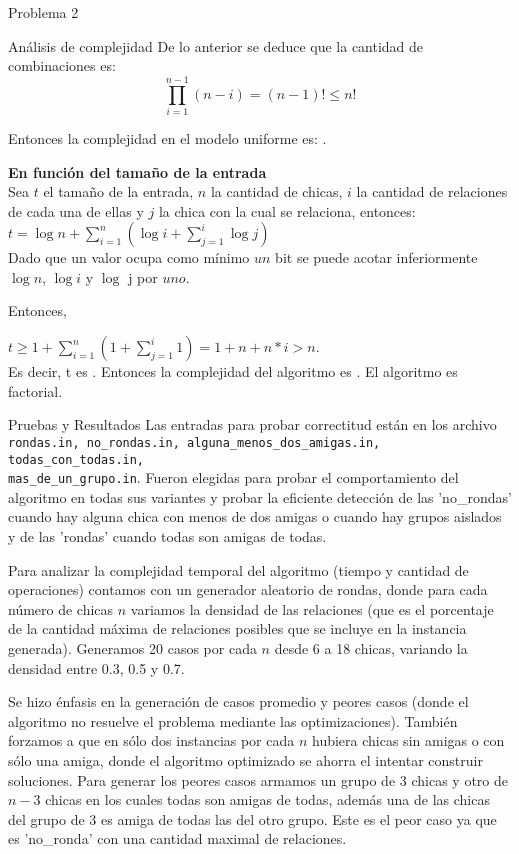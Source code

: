 \begin{section}{Problema 2}
\begin{subsection}{Análisis de complejidad}
			De lo anterior se deduce que la cantidad de combinaciones es: $$\displaystyle\prod_{i=1}^{n-1} (n-i) = (n-1)! \leq n!$$

			Entonces la complejidad en el modelo uniforme es:  .\VSP
		
			\noindent\textbf{En función del tamaño de la entrada}\\

				Sea $t$ el tamaño de la entrada, $n$ la cantidad de chicas, $i$ la cantidad de relaciones de cada una de ellas y $j$ la chica con la cual se relaciona, entonces:\\
				
				$t=\log n + \sum_{i=1}^n (\log i + \sum_{j=1}^i \log j)$\\
				
				Dado que un valor ocupa como mínimo $un$ bit se puede acotar inferiormente $\log n$, $\log i$ y $\log$ j por $uno$.
				
				Entonces,
				
				$t \geq 1 + \sum_{i=1}^n (1 + \sum_{j=1}^i 1)=1 + n + n*i > n$.\\
				
				
				Es decir, t es . Entonces la complejidad del algoritmo es . El algoritmo es factorial.
	\end{subsection}

	\begin{subsection}{Pruebas y Resultados}
		Las entradas para probar correctitud están en los archivo \texttt{rondas.in, no\_rondas.in, alguna\_menos\_dos\_amigas.in, todas\_con\_todas.in, \\
		mas\_de\_un\_grupo.in}.
		Fueron elegidas para probar el comportamiento del algoritmo en todas sus variantes y probar la eficiente detección de las 'no\_rondas' cuando hay alguna chica con menos de dos amigas o cuando hay grupos aislados y de las 'rondas' cuando todas son amigas de todas.
		
		Para analizar la complejidad temporal del algoritmo (tiempo y cantidad de operaciones) contamos con un generador aleatorio de rondas, donde para cada número de chicas $n$ variamos la densidad de las relaciones (que es el porcentaje de la cantidad máxima de relaciones posibles que se incluye en la instancia generada). Generamos 20 casos por cada $n$ desde 6 a 18 chicas, variando la densidad entre 0.3, 0.5 y 0.7.

		 Se hizo énfasis en la generación de casos promedio y peores casos (donde el algoritmo no resuelve el problema mediante las optimizaciones). También forzamos a que en sólo dos instancias por cada $n$ hubiera chicas sin amigas o con sólo una amiga, donde el algoritmo optimizado se ahorra el intentar construir soluciones. Para generar los peores casos armamos un grupo de $3$ chicas y otro de $n-3$ chicas en los cuales todas son amigas de todas, además una de las chicas del grupo de $3$ es amiga de todas las del otro grupo. Este es el peor caso ya que es 'no\_ronda' con una cantidad maximal de relaciones.
		

\end{subsection}
\end{section}
